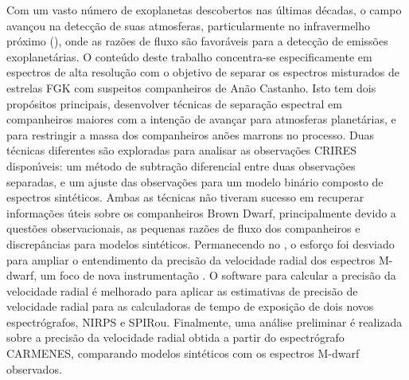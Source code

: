 \begin{abstract-pt}
    Com um vasto n\'{u}mero de exoplanetas descobertos nas \'{u}ltimas d\'{e}cadas, o campo avan\c{c}ou na detec\c{c}\~{a}o de suas atmosferas, particularmente no infravermelho pr\'{o}ximo (\nir{}), onde as raz\~{o}es de fluxo s\~{a}o favor\'{a}veis para a detec\c{c}\~{a}o de emiss\~{o}es exoplanet\'{a}rias.
    O conte\'{u}do deste trabalho concentra-se especificamente em espectros \nir{} de alta resolu\c{c}\~{a}o com o objetivo de separar os espectros misturados de estrelas {FGK} com suspeitos companheiros de An\~{a}o Castanho.
    Isto tem dois prop\'{o}sitos principais, desenvolver \nir{} t\'{e}cnicas de separa\c{c}\~{a}o espectral em companheiros maiores com a inten\c{c}\~{a}o de avan\c{c}ar para atmosferas planet\'{a}rias, e para restringir a massa dos companheiros an\~{o}es marrons no processo.
    Duas t\'{e}cnicas diferentes s\~{a}o exploradas para analisar as observa\c{c}\~{o}es {CRIRES} dispon\'{\i}veis: um m\'{e}todo de subtra\c{c}\~{a}o diferencial entre duas observa\c{c}\~{o}es separadas, e um ajuste \textchisquared{} das observa\c{c}\~{o}es para um modelo bin\'{a}rio composto de espectros sint\'{e}ticos.
    Ambas as t\'{e}cnicas n\~{a}o tiveram sucesso em recuperar informa\c{c}\~{o}es \'{u}teis sobre os companheiros Brown Dwarf, principalmente devido a quest\~{o}es observacionais, as pequenas raz\~{o}es de fluxo dos companheiros e discrep\^{a}ncias para modelos sint\'{e}ticos.
    Permanecendo no \nir{}, o esfor\c{c}o foi desviado para ampliar o entendimento da precis\~{a}o da velocidade radial dos espectros {M-dwarf}, um foco de nova instrumenta\c{c}\~{a}o \nir{}.
    O software para calcular a precis\~{a}o da velocidade radial \'{e} melhorado para aplicar as estimativas de precis\~{a}o de velocidade radial para as calculadoras de tempo de exposi\c{c}\~{a}o de dois novos \nir{} espectr\'{o}grafos, {NIRPS} e {SPIRou}.
    Finalmente, uma an\'{a}lise preliminar \'{e} realizada sobre a precis\~{a}o da velocidade radial obtida a partir do espectr\'{o}grafo {CARMENES}, comparando modelos sint\'{e}ticos com os espectros {M-dwarf} observados.


\end{abstract-pt}
